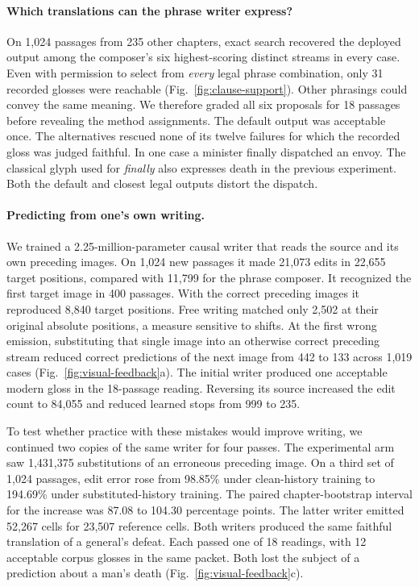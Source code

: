 \paragraph{Which translations can the phrase writer express?}
On 1,024 passages from 235 other chapters, exact search recovered the deployed output among the composer's six highest-scoring distinct streams in every case. Even with permission to select from \emph{every} legal phrase combination, only 31 recorded glosses were reachable (Fig.~\ref{fig:clause-support}). Other phrasings could convey the same meaning. We therefore graded all six proposals for 18 passages before revealing the method assignments. The default output was acceptable once. The alternatives rescued none of its twelve failures for which the recorded gloss was judged faithful. In one case a minister finally dispatched an envoy. The classical glyph used for \emph{finally} also expresses death in the previous experiment. Both the default and closest legal outputs distort the dispatch.

\paragraph{Predicting from one's own writing.}
We trained a 2.25-million-parameter causal writer that reads the source and its own preceding images. On 1,024 new passages it made 21,073 edits in 22,655 target positions, compared with 11,799 for the phrase composer. It recognized the first target image in 400 passages. With the correct preceding images it reproduced 8,840 target positions. Free writing matched only 2,502 at their original absolute positions, a measure sensitive to shifts. At the first wrong emission, substituting that single image into an otherwise correct preceding stream reduced correct predictions of the next image from 442 to 133 across 1,019 cases (Fig.~\ref{fig:visual-feedback}a). The initial writer produced one acceptable modern gloss in the 18-passage reading. Reversing its source increased the edit count to 84,055 and reduced learned stops from 999 to 235.

To test whether practice with these mistakes would improve writing, we continued two copies of the same writer for four passes. The experimental arm saw 1,431,375 substitutions of an erroneous preceding image. On a third set of 1,024 passages, edit error rose from 98.85\% under clean-history training to 194.69\% under substituted-history training. The paired chapter-bootstrap interval for the increase was 87.08 to 104.30 percentage points. The latter writer emitted 52,267 cells for 23,507 reference cells. Both writers produced the same faithful translation of a general's defeat. Each passed one of 18 readings, with 12 acceptable corpus glosses in the same packet. Both lost the subject of a prediction about a man's death (Fig.~\ref{fig:visual-feedback}c).
